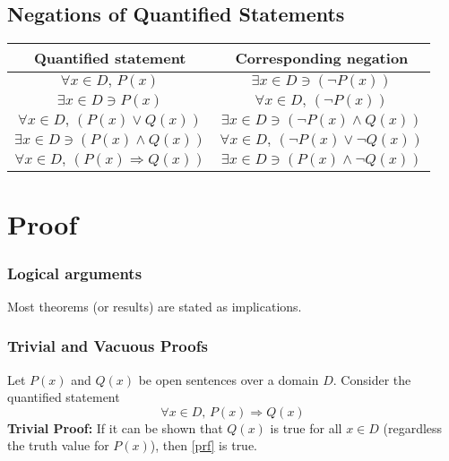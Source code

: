 \documentclass[10pt,reqno]{book}
\theoremstyle{plain}
\begin{document}
	\subsection*{Negations of Quantified Statements}
	
	\begin{center}
		\begin{tabular}{|c|c|}
			\hline
			             Quantified statement               &               Corresponding negation               \\ \hline
			         $ \forall x \in D, \, P(x) $           &        $ \exists x \in D \ni (\neg P(x)) $         \\ \hline
			         $ \exists x \in D \ni P(x) $           &        $ \forall x \in D, \, (\neg P(x)) $         \\ \hline
			   $ \forall x \in D, \, (P(x) \vee Q(x)) $     &  $ \exists x \in D \ni (\neg P(x) \wedge Q(x)) $   \\ \hline
			  $ \exists x \in D \ni (P(x) \wedge Q(x)) $    & $ \forall x \in D, \, (\neg P(x) \vee \neg Q(x)) $ \\ \hline
			$ \forall x \in D, \, (P(x) \Rightarrow Q(x)) $ &  $ \exists x \in D \ni (P(x) \wedge \neg Q(x)) $   \\ \hline
		\end{tabular}
	\end{center}
	

	
	\section{Proof}
	
	\subsubsection*{Logical arguments}
	
	Most theorems (or results) are stated as implications.
	
	\subsubsection*{Trivial and Vacuous Proofs}
	
	Let $ P(x) $ and $ Q(x) $ be open sentences over a domain $ D $. Consider the quantified statement 
	\begin{equation}\label{prf}
		\forall x \in D, \, P(x) \Rightarrow Q(x)
	\end{equation}
	\textbf{Trivial Proof:} If it can be shown that $ Q(x) $ is true for all $ x \in D $ (regardless the truth value for $ P(x) $), then \ref{prf} is true.\\
	
\end{document}
